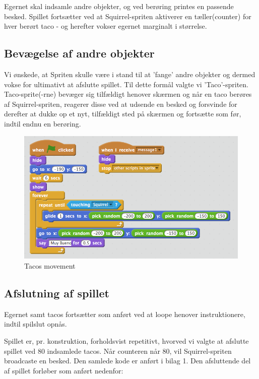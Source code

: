 \documentclass[11pt,a4paper,final]{article}
\begin{document}
Egernet skal indsamle andre objekter, og ved berøring printes en passende besked. Spillet fortsætter ved at Squirrel-spriten aktiverer en tæller(counter) for hver berørt taco - og herefter vokser egernet marginalt i størrelse.


\subsection*{Bevægelse af andre objekter}

Vi ønskede, at Spriten skulle være i stand til at 'fange' andre objekter og dermed vokse for ultimativt at afslutte spillet. Til dette formål valgte vi 'Taco'-spriten. 
Taco-sprite(-rne) bevæger sig tilfældigt henover skærmen og når en taco berøres af Squirrel-spriten, reagerer disse ved at udsende en besked og forsvinde for derefter at dukke op et nyt, tilfældigt sted på skærmen og fortsætte som før, indtil endnu en berøring. 

\begin{figure}[H]
\centering
\includegraphics[scale = 0.4]{Tacos.png}
\caption{Tacos movement}
\end{figure}


\subsection*{Afslutning af spillet}

Egernet samt tacos fortsætter som anført ved at loope henover instruktionere, indtil spilslut opnås. 

Spillet er, pr. konstruktion, forholdsvist repetitivt, hvorved vi valgte at afslutte spillet ved 80 indsamlede tacos.
Når counteren når 80, vil Squirrel-spriten broadcaste en besked. Den samlede kode er anført i bilag 1. Den afsluttende del af spillet forløber som anført nedenfor:
\end{document}
